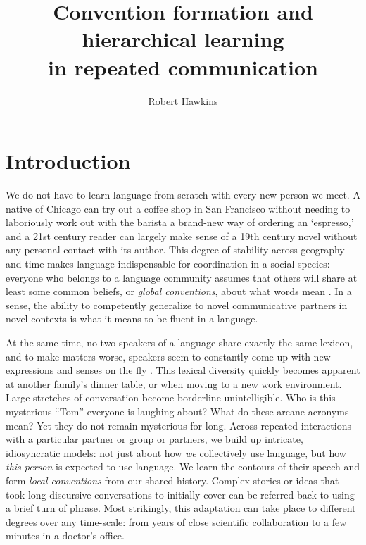 \documentclass[11pt, floatsintext, jou]{apa6}
\title{Convention formation and hierarchical learning \\ in repeated communication}
\author{Robert Hawkins}
\affiliation{Stanford University}
\begin{document}
\maketitle

\section{Introduction}%

We do not have to learn language from scratch with every new person we meet. A native of Chicago can try out a coffee shop in San Francisco without needing to laboriously work out with the barista a brand-new way of ordering an `espresso,' and a 21st century reader can largely make sense of a 19th century novel without any personal contact with its author. This degree of stability across geography and time makes language indispensable for coordination in a social species: everyone who belongs to a language community assumes that others will share at least some common beliefs, or \emph{global conventions}, about what words mean \cite{Lewis69_Convention}. In a sense, the ability to competently generalize to novel communicative partners in novel contexts is what it means to be fluent in a language.

At the same time, no two speakers of a language share exactly the same lexicon, and to make matters worse, speakers seem to constantly come up with new expressions and senses on the fly \cite{Davidson86_DerangementOfEpitaphs, Clark98_CommunalLexicons}. This lexical diversity quickly becomes apparent at another family's dinner table, or when moving to a new work environment. Large stretches of conversation become borderline unintelligible. Who is this mysterious ``Tom'' everyone is laughing about? What do these arcane acronyms mean? Yet they do not remain mysterious for long. Across repeated interactions with a particular partner or group or partners, we build up intricate, idiosyncratic models: not just about how \emph{we} collectively use language, but how \emph{this person} is expected to use language. We learn the contours of their speech and form \emph{local conventions} from our shared history. Complex stories or ideas that took long discursive conversations to initially cover can be referred back to using a brief turn of phrase. Most strikingly, this adaptation can take place to different degrees over any time-scale: from years of close scientific collaboration to a few minutes in a doctor's office.
\end{document}
